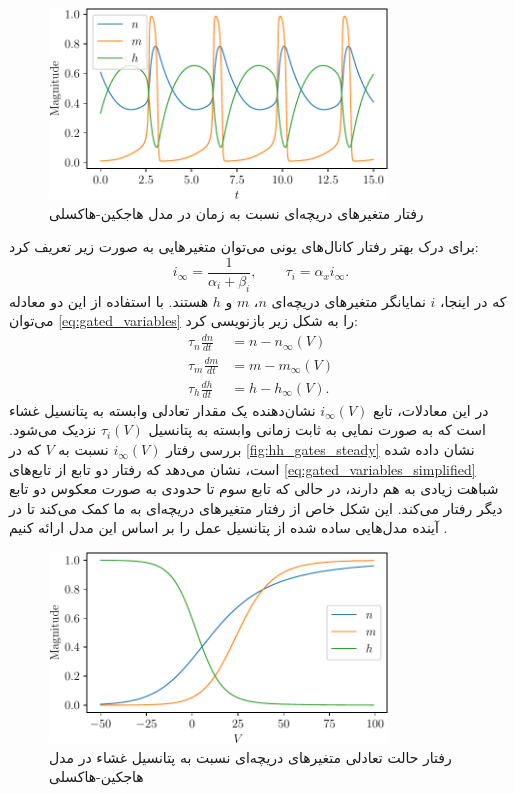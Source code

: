 \begin{figure}[!ht]
    \centering
    \includegraphics[width=0.8\textwidth]{figures/HH_gates}
    \caption{رفتار متغیرهای دریچه‌ای نسبت به زمان در مدل هاجکین-هاکسلی}
    \label{fig:hh_gates}
\end{figure}

برای درک بهتر رفتار کانال‌های یونی می‌توان متغیرهایی به صورت زیر تعریف کرد:
\[ i_{\infty} = \frac{1}{\alpha_{i} + \beta_{i}}, \qquad \tau_i = \alpha_x i_{\infty}. \]
که در اینجا،
\( i \)
نمایانگر متغیرهای دریچه‌ای
\( n \)، \( m \) و \( h \)
هستند. با استفاده از این دو معادله می‌توان
\autoref{eq:gated_variables}
را به شکل زیر بازنویسی کرد:
\begin{subequations} \label{eq:gated_variables_simplified}
    \begin{align}
        \tau_{n} \frac{dn}{dt} & = n - n_{\infty}(V)  \\
        \tau_{m} \frac{dm}{dt} & = m - m_{\infty}(V)  \\
        \tau_{h} \frac{dh}{dt} & = h - h_{\infty}(V).
    \end{align}
\end{subequations}
در این معادلات، تابع
\( i_{\infty}(V) \)
نشان‌دهنده یک مقدار تعادلی وابسته به پتانسیل غشاء است که به صورت نمایی به ثابت زمانی وابسته به پتانسیل
\( \tau_{i}(V) \)
نزدیک می‌شود.
بررسی رفتار
\( i_{\infty}(V) \)
نسبت به
\( V \)
که در
\autoref{fig:hh_gates_steady}
نشان داده شده است، نشان می‌دهد که رفتار دو تابع از تابع‌های
\autoref{eq:gated_variables_simplified}
شباهت زیادی به هم دارند، در حالی که تابع سوم تا حدودی به صورت معکوس دو تابع دیگر رفتار می‌کند.
این شکل خاص از رفتار متغیرهای دریچه‌ای به ما کمک می‌کند تا در آینده مدل‌هایی ساده شده از پتانسیل عمل را بر اساس این مدل ارائه کنیم
\cite{trappenberg2022}.

\begin{figure}[!ht]
    \centering
    \includegraphics[width=0.8\textwidth]{figures/HH_gates_steady}
    \caption{رفتار حالت تعادلی متغیرهای دریچه‌ای نسبت به پتانسیل غشاء در مدل هاجکین-هاکسلی}
    \label{fig:hh_gates_steady}
\end{figure}

